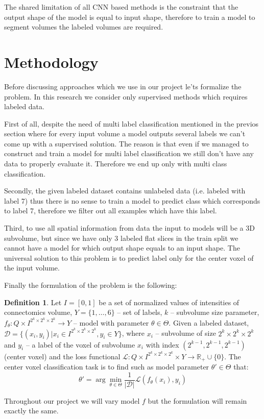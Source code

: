 \documentclass[twocolumn, a4paper]{article}
\theoremstyle{definition}
\newtheorem{definition}{Definition}
\begin{document}
The shared limitation of all CNN based methods is the constraint that the output shape of the model
is equal to input shape, therefore to train a model to segment volumes the labeled volumes are required.

\section{Methodology}
Before discussing approaches which we use in our project le'ts formalize the problem. In this
research we consider only supervised methods which requires labeled data.

First of all, despite the need of multi label classification mentioned in the previos section
where for every input volume a model outputs several labels we can't come up with a
supervised solution. The reason is that even if we managed to construct and train a model for multi label
classification we still don't have any data to properly evaluate it. Therefore we end up only with multi class classification.

Secondly, the given labeled dataset contains unlabeled data (i.e. labeled with label 7) thus
there is no sense to train a model to predict class which corresponds to label 7, therefore we filter
out all examples which have this label.

Third, to use all spatial information from data the input to models will be a 3D subvolume,
but since we have only 3 labeled flat slices in the train split we cannot have a model for which
output shape equals to an input shape. The universal solution to this problem is to predict label
only for the center voxel of the input volume.

Finally the formulation of the problem is the following:
\begin{definition}
    Let \( I = [0, 1] \) be a set of normalized values
    of intensities of connectomics volume, \( Y = \{ 1, \dots, 6 \} \) -- set of labels,
    \( k \) -- subvolume size parameter, \(f_{\theta}: Q \times I^{2^k \times 2^k \times 2^k} \to Y \) -- model
    with parameter \( \theta \in \Theta \).
    Given a labeled dataset,
    \(\mathcal{D} = \{ (x_i, y_i) | x_i \in I^{2^k \times 2^k \times 2^k}, y_i \in Y \}\),
    where \( x_i \) -- subvolume of size \( 2^k \times 2^k \times 2^k \) and
    \( y_i \) -- a label of the voxel of subvolume
    \( x_i \) with index \( (2^{k-1},2^{k-1},2^{k-1}) \) (center voxel) and the loss functional
    \( \mathcal{L}: Q \times I^{2^k \times 2^k \times 2^k} \times Y \to \mathbb{R}_+ \cup \{ 0 \} \).
    The center voxel classification task is to find such as model parameter \( \theta' \in \Theta \) that:
    \begin{equation}
        \theta' = \arg \min\limits_{\theta \in \Theta} \frac{1}{|\mathcal{D}|} \mathcal{L}(f_{\theta}(x_i), y_i)
    \end{equation}
\end{definition}
Throughout our project we will vary model \( f \) but the formulation will remain exactly the same.
\end{document}
